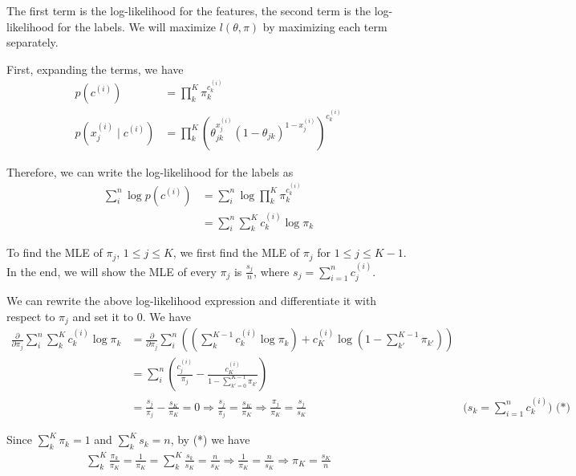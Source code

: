 The first term is the log-likelihood for the features, the second term is the log-likelihood for the labels. We will maximize $l(\theta, \pi)$ by maximizing each term separately.

First, expanding the terms, we have
\begin{align*}
    p(c^{(i)}) &= \prod^{K}_{k}\pi_k^{c^{(i)}_k} \\
    p(x^{(i)}_{j} \mid c^{(i)}) &= \prod^{K}_{k}\left(\theta_{jk}^{x^{(i)}_j} (1 - \theta_{jk})^{1 - x^{(i)}_j} \right)^{c^{(i)}_k}
\end{align*}

Therefore, we can write the log-likelihood for the labels as
\begin{align*}
    \sum^{n}_{i} \log p(c^{(i)}) &= \sum^{n}_{i} \log \prod^{K}_{k}\pi_k^{c^{(i)}_k} \\
    &= \sum^{n}_{i} \sum^{K}_{k} c^{(i)}_k \log \pi_k
\end{align*}

To find the MLE of $\pi_j$, $1 \leq j \leq K$, we first find the MLE of $\pi_j$ for $1 \leq j \leq K - 1$. In the end, we will show the MLE of every $\pi_j$ is $\frac{s_j}{n}$, where $s_j = \sum^{n}_{i = 1} c^{(i)}_j$.

We can rewrite the above log-likelihood expression and differentiate it with respect to $\pi_j$ and set it to 0. We have
\begin{align*}
    \frac{\partial}{\partial \pi_j} \sum^{n}_{i} \sum^{K}_{k} c^{(i)}_k \log \pi_k &= \frac{\partial}{\partial \pi_j} \sum^{n}_{i} \left( \left( \sum^{K - 1}_{k} c^{(i)}_{k} \log \pi_{k} \right) + c^{(i)}_{K} \log \left(1 - \sum^{K - 1}_{k'}\pi_{k'}\right) \right) \\ 
    &= \sum^{n}_{i} \left( \frac{c^{(i)}_{j}}{\pi_j} -  \frac{c^{(i)}_K}{1 - \sum^{K - 1}_{k' = 0}\pi_{k'}} \right)  \\
    &= \frac{s_j}{\pi_j} - \frac{s_K}{\pi_K} = 0 \Longrightarrow \frac{s_j}{\pi_j} = \frac{s_K}{\pi_K} \Longrightarrow \frac{\pi_j}{\pi_K} = \frac{s_j}{s_K} & \mbox{($s_k = \sum^{n}_{i = 1} c^{(i)}_k$) (*)}
\end{align*}

Since $\sum^{K}_{k}\pi_k = 1$ and $\sum^{K}_{k} s_k = n$, by (*) we have
\begin{align*}
    \sum^{K}_{k} \frac{\pi_k}{\pi_K} = \frac{1}{\pi_K} = \sum^{K}_{k} \frac{s_k}{s_K} = \frac{n}{s_K} \Longrightarrow \frac{1}{\pi_K} = \frac{n}{s_K} \Longrightarrow \pi_K = \frac{s_K}{n}
\end{align*}

